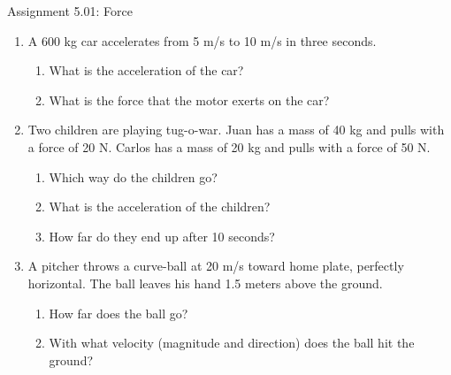 \documentclass[letterpaper, 12pt]{article}
\begin{document}


\begin{center} Assignment 5.01: Force
\end{center}
\vspace{-.3in}
\begin{enumerate}
\item A 600 kg car accelerates from 5 m/s to 10 m/s in three seconds.
\begin{enumerate}
	\item What is the acceleration of the car?
	\vspace{0.4in}
	\item What is the force that the motor exerts on the car?
	\vspace{0.4in}
\end{enumerate}

\item Two children are playing tug-o-war.  Juan has a mass of 40 kg and pulls with a force of 20 N. Carlos has a mass of 20 kg and pulls with a force of 50 N.  
\begin{enumerate}
	\item Which way do the children go?
	\vspace{0.3in}
	\item What is the acceleration of the children?
	\vspace{0.4in}
	\item How far do they end up after 10 seconds?  
	\vspace{0.4in}
\end{enumerate}

\item  A pitcher throws a curve-ball at 20 m/s toward home plate, perfectly horizontal.  The ball leaves his hand 1.5 meters above the ground.  
\begin{enumerate}
	\item How far does the ball go?
	\vspace{0.4in}
	\item With what velocity (magnitude and direction) does the ball hit the ground?
	\vspace{0.4in}
\end{enumerate}



\end{enumerate}
\end{document}
